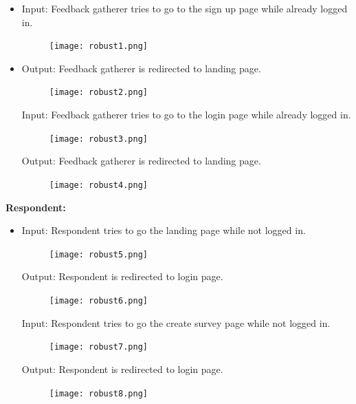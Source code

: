 \documentclass[letterpaper, 12 pt, conference]{ieeeconf}
\begin{document}
\begin{itemize}
    \item[] Input: Feedback gatherer tries to go to the sign up page while already logged in.
    \begin{figure}[h]
        \centering
        \texttt{[image: robust1.png]}
\end{figure}
\item[]


Output: Feedback gatherer is redirected to landing page.
\begin{figure}[h]
        \centering
        \texttt{[image: robust2.png]}
\end{figure}

Input: Feedback gatherer tries to go to the login page while already logged in.
\begin{figure}[h]
        \centering
        \texttt{[image: robust3.png]}
\end{figure}
\clearpage
Output: Feedback gatherer is redirected to landing page.
\begin{figure}[h]
        \centering
        \texttt{[image: robust4.png]}
\end{figure}

\end{itemize}
\newline 
\hfill \break

\textbf{Respondent:}
\begin{itemize}
    \item[] Input: Respondent tries to go the landing page while not logged in.
    \begin{figure}[h]
        \centering
        \texttt{[image: robust5.png]}
\end{figure}

Output: Respondent is redirected to login page.
\begin{figure}[h]
        \centering
        \texttt{[image: robust6.png]}
\end{figure}

Input: Respondent tries to go the create survey page while not logged in.
\begin{figure}[h]
        \centering
        \texttt{[image: robust7.png]}
\end{figure}

Output: Respondent is redirected to login page.
\begin{figure}[h]
        \centering
        \texttt{[image: robust8.png]}
\end{figure}

\end{itemize}
\newpage 
\end{document}
